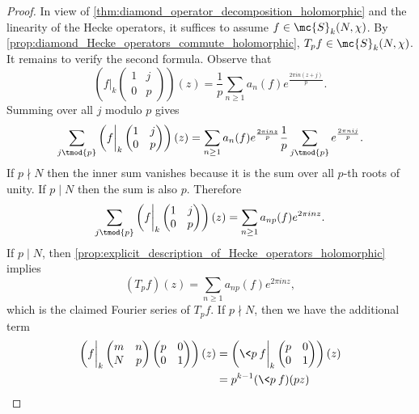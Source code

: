     \begin{proof}
      In view of \cref{thm:diamond_operator_decomposition_holomorphic} and the linearity of the Hecke operators, it suffices to assume $f \in \mc{S}_{k}(N,\chi)$. By \cref{prop:diamond_Hecke_operators_commute_holomorphic}, $T_{p}f \in \mc{S}_{k}(N,\chi)$. It remains to verify the second formula. Observe that
      \[
        \left(f\bigg|_{k}\begin{pmatrix} 1 & j \\ 0 & p \end{pmatrix}\right)(z) = \frac{1}{p}\sum_{n \ge 1}a_{n}(f)e^{\frac{2\pi in(z+j)}{p}}.
      \]
      Summing over all $j$ modulo $p$ gives
      \[
        \sum_{j \tmod{p}}\left(f\bigg|_{k}\begin{pmatrix} 1 & j \\ 0 & p \end{pmatrix}\right)(z) = \sum_{n \ge 1}a_{n}(f)e^{\frac{2\pi inz}{p}}\frac{1}{p}\sum_{j \tmod{p}}e^{\frac{2\pi nij}{p}}.
      \]
      If $p \nmid N$ then the inner sum vanishes because it is the sum over all $p$-th roots of unity. If $p \mid N$ then the sum is also $p$. Therefore
      \[
        \sum_{j \tmod{p}}\left(f\bigg|_{k}\begin{pmatrix} 1 & j \\ 0 & p \end{pmatrix}\right)(z) = \sum_{n \ge 1}a_{np}(f)e^{2\pi inz}.
      \]
      If $p \mid N$, then \cref{prop:explicit_description_of_Hecke_operators_holomorphic} implies
      \begin{equation}\label{equ:Hecke_operator_when_p_divides_holomorphic}
        (T_{p}f)(z) = \sum_{n \ge 1}a_{np}(f)e^{2\pi inz},
      \end{equation}
      which is the claimed Fourier series of $T_{p}f$. If $p \nmid N$, then we have the additional term
      \begin{align*}
        \left(f\bigg|_{k}\begin{pmatrix} m & n \\ N & p \end{pmatrix}\begin{pmatrix} p & 0 \\ 0 & 1 \end{pmatrix}\right)(z) &= \left(\<p\>f\bigg|_{k}\begin{pmatrix} p & 0 \\ 0 & 1 \end{pmatrix}\right)(z) \\
        &= p^{k-1}(\<p\>f)(pz) \\

\end{align*}
\end{proof}
